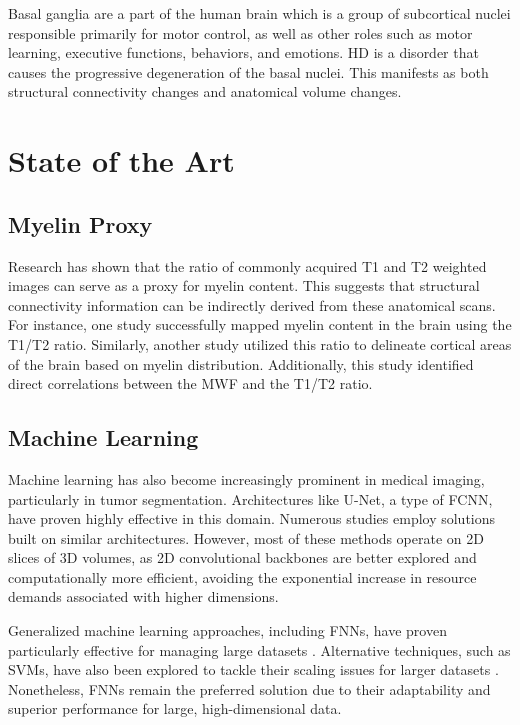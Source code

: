 Basal ganglia are a part of the human brain which is a group of subcortical nuclei responsible primarily for motor control, as well as other roles such as motor learning, executive functions, behaviors, and emotions. \cite{basal} \ac{HD} is a disorder that causes the progressive degeneration of the basal nuclei. \cite{hunting} This manifests as both structural connectivity changes and anatomical volume changes. \cite{basal2}\par

\section{State of the Art}
\label{sec:stateoftheart}

\subsection{Myelin Proxy}

Research has shown that the ratio of commonly acquired T1 and T2 weighted images can serve as a proxy for myelin content. This suggests that structural connectivity information can be indirectly derived from these anatomical scans. For instance, one study \cite{myelin2} successfully mapped myelin content in the brain using the T1/T2 ratio. Similarly, another study \cite{myelin} utilized this ratio to delineate cortical areas of the brain based on myelin distribution. Additionally, this study \cite{myelin3} identified direct correlations between the \ac{MWF} and the T1/T2 ratio.

\subsection{Machine Learning}

Machine learning has also become increasingly prominent in medical imaging, particularly in tumor segmentation. Architectures like U-Net, a type of \ac{FCNN}, have proven highly effective in this domain. Numerous studies \cite{unetseg} \cite{unetseg2} \cite{unetseg3} \cite{unetseg4} \cite{unetseg5} employ solutions built on similar architectures. However, most of these methods operate on 2D slices of 3D volumes, as 2D convolutional backbones are better explored and computationally more efficient, avoiding the exponential increase in resource demands associated with higher dimensions.\par
Generalized machine learning approaches, including \ac{FNN}s, have proven particularly effective for managing large datasets \cite{fnn1}. Alternative techniques, such as \ac{SVM}s, have also been explored to tackle their scaling issues for larger datasets \cite{svm1} \cite{svm2}. Nonetheless, \ac{FNN}s remain the preferred solution due to their adaptability and superior performance for large, high-dimensional data.

